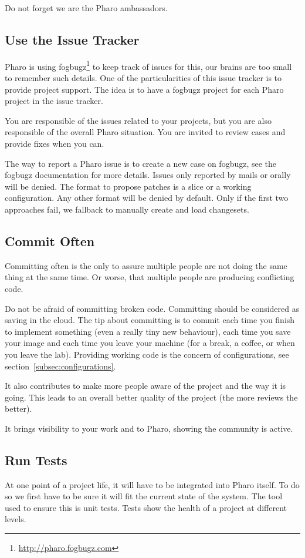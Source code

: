 \documentclass[10pt]{article}
\begin{document}
Do not forget we are the Pharo ambassadors.

\subsection{Use the Issue Tracker}
Pharo is using fogbugz\footnote{\url{http://pharo.fogbugz.com}} to keep track of issues for this, our brains are too small to remember such details.
One of the particularities of this issue tracker is to provide project support. The idea is to have a fogbugz project for each Pharo project  in the issue tracker.

You are responsible of the issues related to your projects, but you are also responsible of the overall Pharo situation. You are invited to review cases and provide fixes when you can.

The way to report a Pharo issue is to create a new case on fogbugz, see the fogbugz documentation for more details. Issues only reported by mails or orally will be denied.
The format to propose patches is a slice or a working configuration. Any other format will be denied by default. Only if the first two approaches fail, we fallback to manually create and load changesets.

\subsection{Commit Often}
Committing often is the only to assure multiple people are not doing the same thing at the same time.
Or worse, that multiple people are producing conflicting code.

Do not be afraid of committing broken code. Committing should be considered as saving in the cloud. The tip about committing is to commit each time you finish to implement something (even a really tiny new behaviour), each time you save your image and each time you leave your machine (for a break, a coffee, or when you leave the lab). Providing working code is the concern of configurations, see section~\ref{subsec:configurations}.

It also contributes to make more people aware of the project and the way it is going. This leads to an overall better quality of the project (the more reviews the better).

It brings visibility to your work and to Pharo, showing the community is active.

\subsection{Run Tests}
At one point of a project life, it will have to be integrated into Pharo itself. 
To do so we first have to be sure it will fit the current state of the system.
The tool used to ensure this is unit tests. Tests show the health of a project at different levels.
\end{document}
